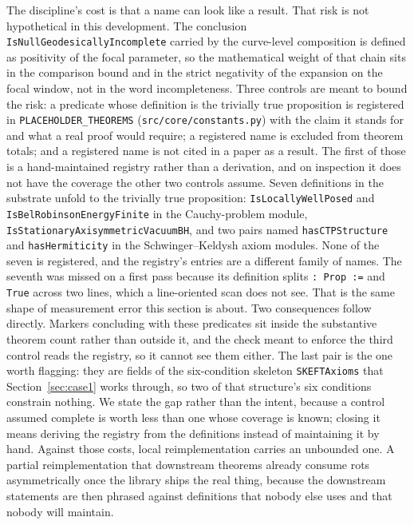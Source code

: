 \documentclass[11pt]{article}
\begin{document}
The discipline's cost is that a name can look like a result. That
risk is not hypothetical in this development. The conclusion
\texttt{IsNullGeodesicallyIncomplete} carried by the curve-level
composition is defined as positivity of the focal parameter, so the
mathematical weight of that chain sits in the comparison bound and in
the strict negativity of the expansion on the focal window, not in
the word incompleteness. Three controls are meant to bound the risk: a
predicate whose definition is the trivially true proposition is
registered in \texttt{PLACEHOLDER\_THEOREMS}
(\texttt{src/core/constants.py}) with the claim it stands for and what
a real proof would require; a registered name is excluded from theorem
totals; and a registered name is not cited in a paper as a result.
The first of those is a hand-maintained registry rather than a
derivation, and on inspection it does not have the coverage the other
two controls assume. Seven definitions in the substrate unfold to the
trivially true proposition: \texttt{IsLocallyWellPosed} and
\texttt{IsBelRobinsonEnergyFinite} in the Cauchy-problem module,
\texttt{IsStationaryAxisymmetricVacuumBH}, and two pairs named
\texttt{hasCTPStructure} and \texttt{hasHermiticity} in the
Schwinger--Keldysh axiom modules. None of the seven is registered, and
the registry's entries are a different family of names. The seventh
was missed on a first pass because its definition splits \texttt{:
Prop :=} and \texttt{True} across two lines, which a line-oriented
scan does not see. That is the same shape of measurement error this
section is about. Two
consequences follow directly. Markers concluding with these predicates
sit inside the substantive theorem count rather than outside it, and
the check meant to enforce the third control reads the registry, so it
cannot see them either. The last pair is the one worth flagging: they
are fields of the six-condition skeleton \texttt{SKEFTAxioms} that
Section~\ref{sec:case1} works through, so two of that structure's six
conditions constrain nothing. We state the gap rather than the intent,
because a control assumed complete is worth less than one whose
coverage is known; closing it means deriving the registry from the
definitions instead of maintaining it by hand.
Against
those costs, local reimplementation carries an unbounded one. A
partial reimplementation that downstream theorems already consume
rots asymmetrically once the library ships the real thing, because
the downstream statements are then phrased against definitions that
nobody else uses and that nobody will maintain.
\end{document}
